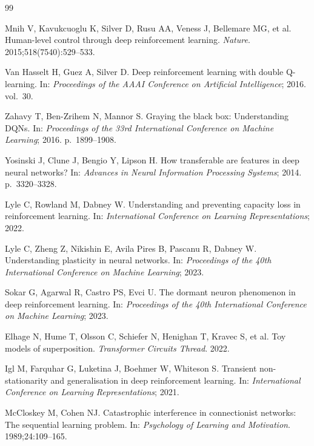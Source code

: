 \documentclass[a4paper]{article}
\begin{document}
\newpage
\begin{thebibliography}{99}

Mnih V, Kavukcuoglu K, Silver D, Rusu AA, Veness J, Bellemare MG, et al.
Human-level control through deep reinforcement learning.
\textit{Nature}. 2015;518(7540):529--533.

Van Hasselt H, Guez A, Silver D.
Deep reinforcement learning with double Q-learning.
In: \textit{Proceedings of the AAAI Conference on Artificial Intelligence}; 2016. vol.~30.

Zahavy T, Ben-Zrihem N, Mannor S.
Graying the black box: Understanding DQNs.
In: \textit{Proceedings of the 33rd International Conference on Machine Learning}; 2016.
p.~1899--1908.

Yosinski J, Clune J, Bengio Y, Lipson H.
How transferable are features in deep neural networks?
In: \textit{Advances in Neural Information Processing Systems}; 2014. p.~3320--3328.

Lyle C, Rowland M, Dabney W.
Understanding and preventing capacity loss in reinforcement learning.
In: \textit{International Conference on Learning Representations}; 2022.

Lyle C, Zheng Z, Nikishin E, Avila Pires B, Pascanu R, Dabney W.
Understanding plasticity in neural networks.
In: \textit{Proceedings of the 40th International Conference on Machine Learning}; 2023.

Sokar G, Agarwal R, Castro PS, Evci U.
The dormant neuron phenomenon in deep reinforcement learning.
In: \textit{Proceedings of the 40th International Conference on Machine Learning}; 2023.

Elhage N, Hume T, Olsson C, Schiefer N, Henighan T, Kravec S, et al.
Toy models of superposition.
\textit{Transformer Circuits Thread}. 2022.

Igl M, Farquhar G, Luketina J, Boehmer W, Whiteson S.
Transient non-stationarity and generalisation in deep reinforcement learning.
In: \textit{International Conference on Learning Representations}; 2021.

McCloskey M, Cohen NJ.
Catastrophic interference in connectionist networks: The sequential learning problem.
In: \textit{Psychology of Learning and Motivation}. 1989;24:109--165.


\end{thebibliography}
\end{document}
